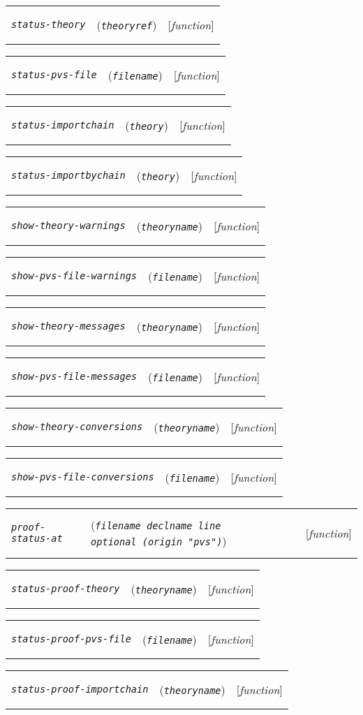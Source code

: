 \documentclass[12pt]{book}
\makeatletter
\def\ampoptional{{\smaller\sc {\smaller\smaller \&}optional\ }}
\newenvironment{function}[3]%
{\par\noindent\begin{boxedminipage}{\textwidth}%
 \par\noindent\begin{tabularx}{\linewidth}{l>{\raggedright}Xr}%
 \functionhtgt{#1}&(\texttt{\textit{#2}})&[\emph{#3}]%
 \end{tabularx}\par\flushright\begin{minipage}{.97\textwidth}}
{\end{minipage}\end{boxedminipage}}
\newcommand{\functionnm}[1]{\texttt{\textit{#1}}}
\newcommand{\functionhtgt}[1]{\hypertarget{#1}{\functionnm{#1}}\index{#1@\functionnm{#1}|underline}}
\newenvironment{lispfunction}[2]%
{\begin{function}{#1}{#2}{function}}{\end{function}}
\makeatother
\begin{document}
\begin{lispfunction}{status-theory}{theoryref}
\end{lispfunction}

\begin{lispfunction}{status-pvs-file}{filename}
\end{lispfunction}

\begin{lispfunction}{status-importchain}{theory}
\end{lispfunction}

\begin{lispfunction}{status-importbychain}{theory}
\end{lispfunction}

\begin{lispfunction}{show-theory-warnings}{theoryname}
\end{lispfunction}

\begin{lispfunction}{show-pvs-file-warnings}{filename}
\end{lispfunction}

\begin{lispfunction}{show-theory-messages}{theoryname}
\end{lispfunction}

\begin{lispfunction}{show-pvs-file-messages}{filename}
\end{lispfunction}

\begin{lispfunction}{show-theory-conversions}{theoryname}
\end{lispfunction}

\begin{lispfunction}{show-pvs-file-conversions}{filename}
\end{lispfunction}

\begin{lispfunction}{proof-status-at}
  {filename declname line \ampoptional \textup{(}origin \textup{"pvs"}\textup{)}}
\end{lispfunction}

\begin{lispfunction}{status-proof-theory}{theoryname}
\end{lispfunction}

\begin{lispfunction}{status-proof-pvs-file}{filename}
\end{lispfunction}

\begin{lispfunction}{status-proof-importchain}{theoryname}
\end{lispfunction}
\end{document}
